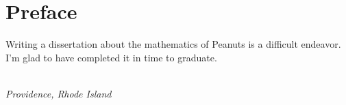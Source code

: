\chapter*{Preface}


Writing a dissertation about the mathematics of Peanuts is a difficult
endeavor. I'm glad to have completed it in time to graduate.

\bigskip

\begin{flushright}
\parbox{2in}{\em
\myname\\[2mm]
Providence, Rhode Island
}
\end{flushright}
